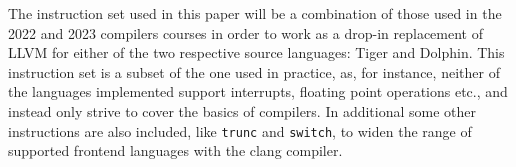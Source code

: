 \documentclass{article}
\begin{document}
The instruction set used in this paper will be a combination of those used in the 2022 and 2023 compilers courses in order to work as a drop-in replacement of LLVM for either of the two respective source languages:  Tiger and Dolphin. This instruction set is a subset of the one used in practice, as, for instance, neither of the languages implemented support interrupts, floating point operations etc., and instead only strive to cover the basics of compilers. In additional some other instructions are also included, like \lstinline!trunc! and \lstinline!switch!, to widen the range of supported frontend languages with the clang compiler.


\end{document}
